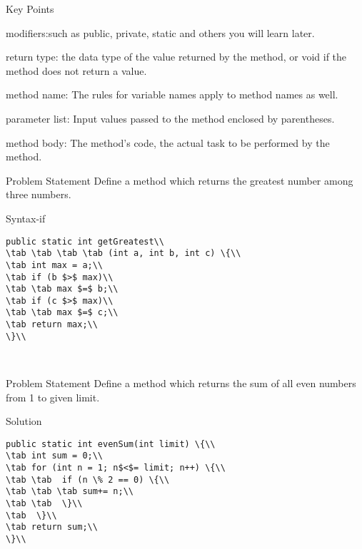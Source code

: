\documentclass[aspectratio=169,14pt,usenames,dvipsnames]{beamer}
\newcommand\tab[1][1cm]{\hspace*{#1}}
\begin{document}
\begin{frame}{Key Points}
\begin{block}{modifiers:}such as public, private, static and others you will learn later.
\end{block}
\begin{block}{return type:}
the data type of the value returned by the method, or void if the method does not return a value.
\end{block}
\begin{block}{method name:}
The rules for variable names apply to method names as well.
\end{block}
\begin{block}{parameter list:}
Input values passed to the method enclosed by parentheses.
\end{block}
\begin{block}{method body:}
The method’s code, the actual
task to be performed by the method.
\end{block}
\end{frame}


\begin{frame}{Problem Statement}
Define a method which returns the greatest
number among three numbers.
\end{frame}

\begin{frame}{Syntax-if}
\begin{lstlisting}
public static int getGreatest\\
\tab \tab \tab \tab (int a, int b, int c) \{\\
\tab int max = a;\\
\tab if (b $>$ max)\\
\tab \tab max $=$ b;\\
\tab if (c $>$ max)\\
\tab \tab max $=$ c;\\
\tab return max;\\
\}\\
\end{lstlisting}\\
\end{frame}

\begin{frame}{Problem Statement}
Define a method which returns the sum of all
even numbers from 1 to given limit.
\end{frame}

\begin{frame}{Solution}
\begin{lstlisting}
public static int evenSum(int limit) \{\\
\tab int sum = 0;\\
\tab for (int n = 1; n$<$= limit; n++) \{\\
\tab \tab  if (n \% 2 == 0) \{\\
\tab \tab \tab sum+= n;\\
\tab \tab  \}\\
\tab  \}\\
\tab return sum;\\
\}\\
\end{lstlisting}
\end{frame}
\end{document}
